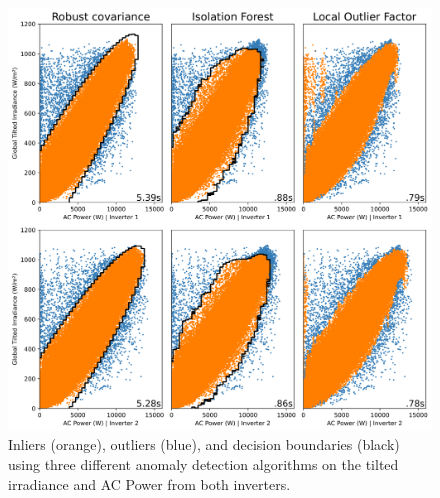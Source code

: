 \begin{figure}[h!]
    \centering
    \includegraphics[width=\textwidth]{figures/appendix/b_analysis/21_cleaning_tilted_irrad-1.png}
    \caption{Inliers (orange), outliers (blue), and decision boundaries (black) using three different anomaly detection algorithms on the tilted irradiance and AC Power from both inverters.}
    \label{fig:clean_tilted_irrad}
\end{figure}

